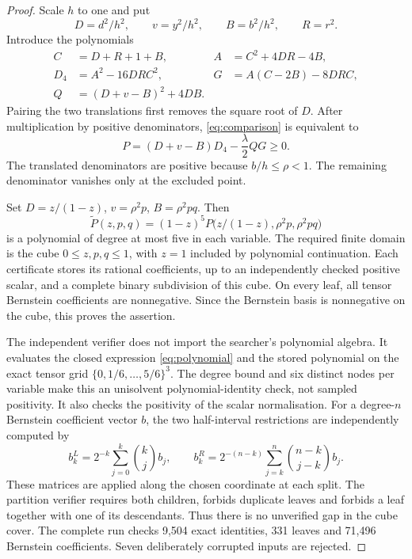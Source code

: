 \documentclass[11pt,a4paper]{article}
\theoremstyle{definition}\newtheorem{definition}[theorem]{Definition}
\theoremstyle{remark}\newtheorem{remark}[theorem]{Remark}
\begin{document}
\begin{proof}
Scale $h$ to one and put
\[
 D=d^2/h^2,\qquad v=y^2/h^2,\qquad B=b^2/h^2,\qquad R=r^2.
\]
Introduce the polynomials
\begin{align*}
 C&=D+R+1+B,& A&=C^2+4DR-4B,\\
 D_4&=A^2-16DRC^2,&G&=A(C-2B)-8DRC,\\
 Q&=(D+v-B)^2+4DB.
\end{align*}
Pairing the two translations first removes the square root of $D$.
After multiplication by positive denominators, \eqref{eq:comparison}
is equivalent to
\begin{equation}\label{eq:polynomial}
 P=(D+v-B)D_4-\frac{\lambda}{2}QG\ge0.
\end{equation}
The translated denominators are positive because $b/h\le\rho<1$.
The remaining denominator vanishes only at the excluded point.

Set $D=z/(1-z)$, $v=\rho^2p$, $B=\rho^2pq$. Then
\[
 \widetilde P(z,p,q)=(1-z)^5P\bigl(z/(1-z),\rho^2p,\rho^2pq\bigr)
\]
is a polynomial of degree at most five in each variable. The required
finite domain is the cube $0\le z,p,q\le1$, with $z=1$ included by
polynomial continuation.
Each certificate stores its rational coefficients, up to an independently
checked positive scalar, and a complete binary subdivision of this cube.
On every leaf, all tensor Bernstein coefficients are nonnegative. Since
the Bernstein basis is nonnegative on the cube, this proves the assertion.

The independent verifier does not import the searcher's polynomial algebra.
It evaluates the closed expression \eqref{eq:polynomial} and the stored
polynomial on the exact tensor grid
$\{0,1/6,\ldots,5/6\}^3$. The degree bound and six distinct nodes per
variable make this an unisolvent polynomial-identity check, not sampled
positivity. It also checks the positivity of the scalar normalisation.
For a degree-$n$ Bernstein coefficient vector $b$, the two half-interval
restrictions are independently computed by
\[
 b_k^L=2^{-k}\sum_{j=0}^{k}\binom kj b_j,\qquad
 b_k^R=2^{-(n-k)}\sum_{j=k}^{n}\binom{n-k}{j-k}b_j.
\]
These matrices are applied along the chosen coordinate at each split.
The partition verifier requires both children, forbids duplicate leaves
and forbids a leaf together with one of its descendants. Thus there is no
unverified gap in the cube cover.
The complete run checks 9,504 exact identities, 331 leaves and 71,496
Bernstein coefficients. Seven deliberately corrupted inputs are rejected.
\end{proof}
\end{document}
